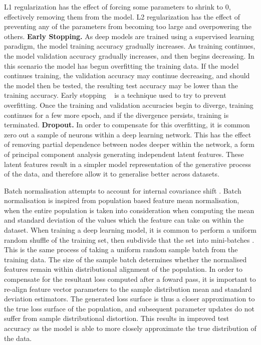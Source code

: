 L1 regularization has the effect of forcing some parameters to shrink to 0, effectively removing them from the model. L2 regularization has the effect of preventing any of the parameters from becoming too large and overpowering the others. \newline
\textbf{Early Stopping.} As deep models are trained using a supervised learning paradigm, the model training accuracy gradually increases. As training continues, the model validation accuracy gradually increases, and then begins decreasing. In this scenario the model has begun overfitting the training data. If the model continues training, the validation accuracy may continue decreasing, and should the model then be tested, the resulting test accuracy may be lower than the training accuracy. Early stopping ~\citep{prechelt1998early} is a technique used to try to prevent overfitting. Once the training and validation accuracies begin to diverge, training continues for a few more epoch, and if the divergence persists, training is terminated. \newline
\textbf{Dropout.} In order to compensate for this overfitting, it is common zero out a sample of neurons within a deep learning network. This has the effect of removing partial dependence between nodes deeper within the network, a form of principal component analysis generating independent latent features. These latent features result in a simpler model representation of the generative process of the data, and therefore allow it to generalise better across datasets. \newline

Batch normalisation attempts to account for internal covariance shift \cite{reference}. Batch normalisation is inspired from population based feature mean normalisation, when the entire population is taken into consideration when computing the mean and standard deviation of the values which the feature can take on within the dataset. When training a deep learning model, it is common to perform a uniform random shuffle of the training set, then subdivide that the set into mini-batches \cite{reference}. This is the same process of taking a uniform random sample batch from the training data. The size of the sample batch determines whether the normalised features remain within distributional alignment of the population. In order to compensate for the resultant loss computed after a foward pass, it is important to re-align feature vector parameters to the sample distribution mean and standard deviation estimators. The generated loss surface is thus a closer approximation to the true loss surface of the population, and subsequent parameter updates do not suffer from sample distributional distortion. This results in improved test accuracy as the model is able to more closely approximate the true distribution of the data. \newline 

